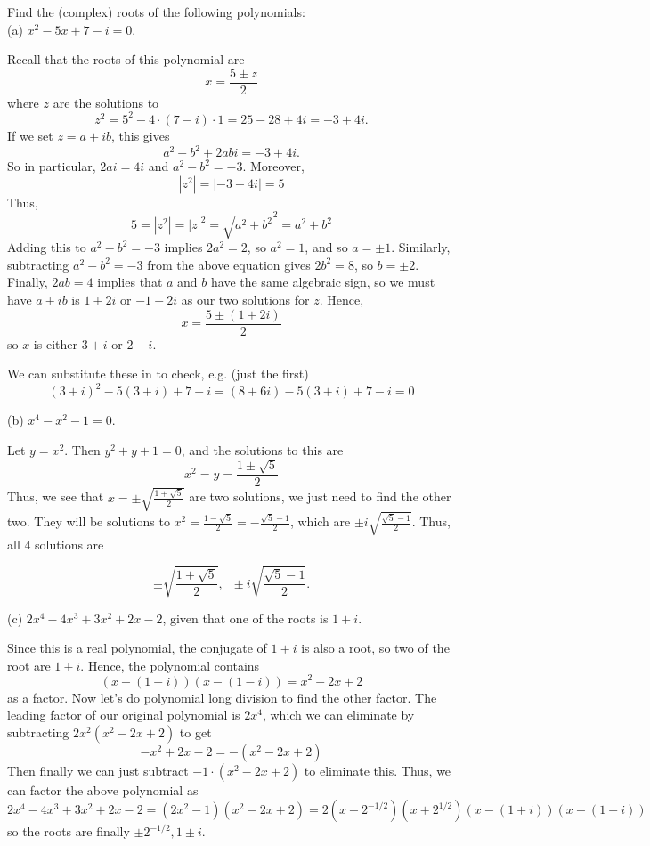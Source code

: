 \documentclass[11pt,dvipsnames]{book}
\numberwithin{figure}{section} %
\numberwithin{table}{section} %
\begin{document}
\begin{exercise} Find the (complex) roots of the following polynomials:\\

(a) $x^2-5x+7-i=0$.

\begin{solution}
Recall that the roots of this polynomial are
\[x= \frac{5\pm z}{2}\]
where $z$ are the solutions to
\[z^2 = 5^2-4\cdot (7-i)\cdot 1  = 25-28+4i = -3+4i.\]
If we set $z=a+ib$, this gives
\[a^2-b^2+2abi = -3+4i.\]
So in particular, $2ai = 4i$ and $a^2-b^2 = -3$. Moreover,
\[|z^2|= |-3 + 4i| = 5\]
Thus,
\[
5=|z^2|=|z|^2 = \sqrt{a^2+b^2}^2 = a^2+b^2
\]
Adding this to  $a^2-b^2=-3$ implies $2a^2 = 2$, so $a^2=1$, and so $a = \pm 1$.
Similarly, subtracting $a^2-b^2=-3$ from the above equation gives $2b^2 = 8$, so $b=\pm 2$.
Finally, $2ab = 4$ implies that $a$ and $b$ have the same algebraic sign, so we must have $a+ib$ is $1+2i$ or $-1-2i$ as our two solutions for $z$. Hence,
\[
x=\frac{5 \pm (1+2i)}{2} \]
so $x$ is either $3+i$ or $2-i$.

We can substitute these in to check, e.g. (just the first)
\[ (3+i)^2-5(3+i)+7-i = (8+6i)-5(3+i)+7-i =0 \]
\end{solution}

(b)  $ x^4 -x^2 - 1 = 0$.

\begin{solution}
Let $y=x^2$. Then $y^2+y+1=0$, and the solutions to this are
\[
x^2=y=\frac{1\pm \sqrt{5}}{2}
\]
Thus, we see that $x=\pm \sqrt{\frac{1+\sqrt{5}}{2}}$ are two solutions, we just need to find the other two. They will be solutions to $x^2 = \frac{1-\sqrt{5}}{2} = - \frac{\sqrt{5}-1}{2}$, which are $\pm i \sqrt{\frac{\sqrt{5}-1}{2}}$. Thus, all 4 solutions are

\[
\pm \sqrt{\frac{1+\sqrt{5}}{2}}, \;\; \pm i \sqrt{\frac{\sqrt{5}-1}{2}}.
\]
\end{solution}

(c) $2x^4-4x^3+3x^2+2x-2$, given that one of the roots is $1+i$.

\begin{solution}
Since this is a real polynomial, the conjugate of $1+i$ is also a root, so two of the root are $1\pm i$. Hence, the polynomial contains
\[
(x-(1+i))(x-(1-i))=
x^2-2x+2
\]
as a factor. Now let's do polynomial long division to find the other factor. The leading factor of our original polynomial is $2x^{4}$, which we can eliminate by subtracting $2x^2(x^2-2x+2)$ to get
\[
-x^2+2x-2=-(x^2-2x+2)
\]
Then finally we can just subtract $-1\cdot (x^2-2x+2)$ to eliminate this.
Thus, we can factor the above polynomial as
\[
2x^4-4x^3+3x^2+2x-2=(2x^2-1)(x^2-2x+2)=2(x-2^{-1/2})(x+2^{1/2})(x-(1+i))(x+(1-i))
\]
so the roots are finally $\pm 2^{-1/2}, 1\pm i$.
\end{solution}

\end{exercise}
\end{document}
